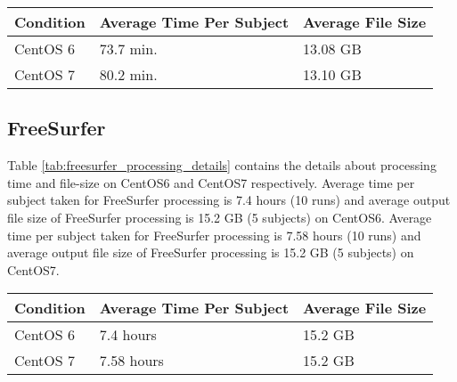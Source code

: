 
\begin{center}
\tabulinesep=1.2mm
\begin{tabular}{ | l | l | l | }
  \hline
  \textbf{Condition} & \textbf{Average Time Per Subject} & \textbf{Average File Size} \\
  \hline
    CentOS 6 & 73.7 min. & 13.08 GB \\
  \hline
    CentOS 7 & 80.2 min. & 13.10 GB \\
  \hline
\end{tabular}
\label{tab:prefreesurfer_processing_details}
\end{center}



\subsection{FreeSurfer}
Table \ref{tab:freesurfer_processing_details} contains the details about processing time and file-size on CentOS6 and CentOS7 respectively.
Average time per subject taken for FreeSurfer processing is 7.4 hours (10 runs) and average output file size of FreeSurfer processing is 15.2 GB (5 subjects) on CentOS6.
Average time per subject taken for FreeSurfer processing is 7.58 hours (10 runs) and average output file size of FreeSurfer processing is 15.2 GB (5 subjects) on CentOS7.

\begin{center}
\begin{tabular}{ | l | l | l | }
  \hline
    \textbf{Condition} & \textbf{Average Time Per Subject} & \textbf{Average File Size} \\
  \hline
    CentOS 6 & 7.4 hours & 15.2 GB \\
  \hline
    CentOS 7 & 7.58 hours & 15.2 GB \\
  \hline
\end{tabular}
\label{tab:freesurfer_processing_details}
\end{center}

